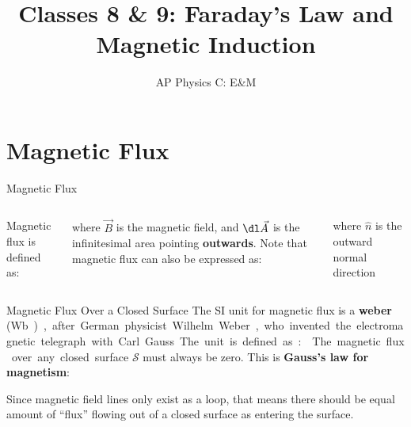 \documentclass[12pt,aspectratio=169]{beamer}
\title{Classes 8 \& 9: Faraday's Law and Magnetic Induction}
\subtitle{AP Physics C: E\&M}
\begin{document}
\begin{frame}
  \maketitle
\end{frame}


\section{Magnetic Flux}


\begin{frame}{Magnetic Flux}
  \begin{columns}
  
    Magnetic flux is defined as:
    
    
    where $\vec B$ is the magnetic field, and $\dl\vec A$ is the infinitesimal
    area pointing \textbf{outwards}. Note that magnetic flux can also be
    expressed as:


    where $\hat n$ is the outward normal direction
  \end{columns}
\end{frame}



\begin{frame}{Magnetic Flux Over a Closed Surface}
  The SI unit for magnetic flux is a \textbf{weber} (\si\weber), after
  German physicist Wilhelm Weber, who invented the electromagnetic telegraph
  with Carl Gauss. The unit is defined as:

  
  The magnetic flux over any closed surface $\mathcal S$ must always be zero.
  This is \textbf{Gauss's law for magnetism}:


  Since magnetic field lines only exist as a loop, that means there should be
  equal amount of ``flux'' flowing out of a closed surface as entering the
  surface.
\end{frame}
\end{document}
